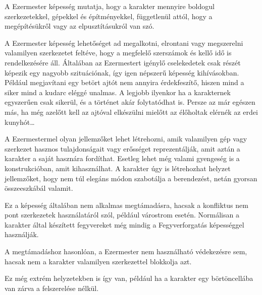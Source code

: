
A Ezermester képesség mutatja, hogy a karakter mennyire boldogul szerkezetekkel, gépekkel és építményekkel, függetlenül attól, hogy a megépítésükről vagy az elpusztításukról van szó.

\overcome A Ezermester képesség lehetőséget ad megalkotni, elrontani vagy megszerelni valamilyen szerkezetet feltéve, hogy a megfelelő szerszámok és kellő idő is rendelkezésére áll. Általában az Ezermestert igénylő cselekedetek csak részét képezik egy nagyobb szituációnak, így igen népszerű képesség kihívásokban. Például megjavítani egy betört ajtót nem annyira érdekfeszítő, hiszen mind a siker mind a kudarc eléggé unalmas. A legjobb ilyenkor ha a karakternek egyszerűen csak sikerül, és a történet akár folytatódhat is. Persze az már egészen más, ha még azelőtt kell az ajtóval elkészülni mielőtt az élőholtak elérnék az erdei kunyhót…

\advantage A Ezermestermel olyan jellemzőket lehet létrehozni, amik valamilyen gép vagy szerkezet hasznos tulajdonságait vagy erősséget reprezentálják, amit aztán a karakter a saját hasznára fordíthat. Esetleg lehet még valami gyengeség is a konstrukcióban, amit kihasználhat. A karakter úgy is létrehozhat helyzet jellemzőket, hogy nem túl elegáns módon szabotálja a berendezést, netán gyorsan összeeszkábál valamit.

\attack Ez a képesség általában nem alkalmas megtámadásra, hacsak a konfliktus nem pont szerkezetek használatáról szól, például várostrom esetén. Normálisan a karakter által készített fegyvereket még mindig a Fegyverforgatás képességgel használják.

 A megtámadáshoz hasonlóan, a Ezermester nem használható védekezésre sem, hacsak nem a karakter valamilyen szerkezettel blokkolja azt.


Ez még extrém helyzetekben is így van, például ha a karakter egy börtöncellába van zárva a felszerelése nélkül.


